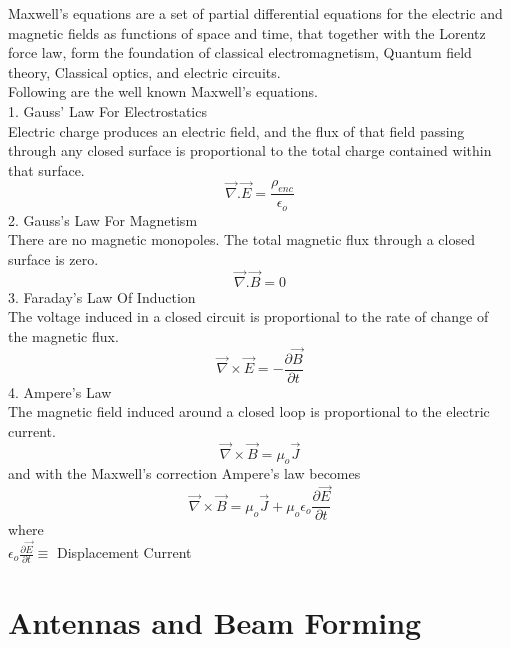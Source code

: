 Maxwell’s equations are a set of partial differential equations for the electric and magnetic fields as functions of space and time, that together with the Lorentz force law, form the foundation of classical electromagnetism, Quantum field theory, Classical optics, and electric circuits.\\ 
Following are the well known Maxwell's equations.\\
1. Gauss’ Law For Electrostatics\\
Electric charge produces an electric field, and the flux of that field passing through any closed surface is proportional to the total charge contained within that surface.\\
\begin{equation}
\vec{\nabla}.\vec{E} = \frac{\rho_{enc}}{\epsilon_{o}}
\end{equation}
2. Gauss’s Law For Magnetism\\
There are no magnetic monopoles. The total magnetic flux through a closed surface is zero.\\
\begin{equation}
\vec{\nabla}.\vec{B} = 0
\end{equation}
3. Faraday’s Law Of Induction\\
The voltage induced in a closed circuit is proportional to the rate of change of the magnetic flux.\\
\begin{equation}
\vec{\nabla}\times\vec{E} = - \frac{\partial\vec{B}}{\partial t}
\end{equation}
4. Ampere’s Law\\
The magnetic field induced around a closed loop is proportional to the electric current.\\
\begin{equation}
\vec{\nabla}\times\vec{B} =\mu_{o}\vec{J}
\end{equation}
and with the Maxwell's correction Ampere's law becomes\\
\begin{equation}
\vec{\nabla}\times\vec{B} =\mu_{o}\vec{J}+\mu_{o}\epsilon_{o}\frac{\partial\vec{E}}{\partial t}
\end{equation}
where\\

$\epsilon_{o}\frac{\partial\vec{E}}{\partial t}\equiv$ Displacement Current

\section{Antennas and Beam Forming}

